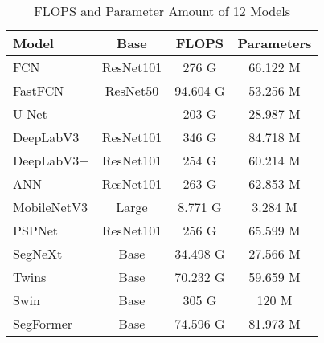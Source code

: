 \begin{table*}[!h]
\caption{FLOPS and Parameter Amount of 12 Models}
\label{tab:parameters}
\noindent
\begin{tabular}{lccc}
\toprule
Model       & Base & FLOPS & Parameters \\ \midrule
FCN         & ResNet101 & 276 G & 66.122 M \\
FastFCN     & ResNet50 & 94.604 G & 53.256 M \\
U-Net       & -        & 203 G & 28.987 M \\
DeepLabV3   & ResNet101 & 346 G & 84.718 M \\
DeepLabV3+  & ResNet101 & 254 G & 60.214 M \\
ANN         & ResNet101 & 263 G & 62.853 M \\
MobileNetV3 & Large & 8.771 G    & 3.284 M \\
PSPNet      & ResNet101 & 256 G & 65.599 M \\
SegNeXt     & Base & 34.498 G & 27.566 M \\
Twins       & Base & 70.232 G & 59.659 M \\
Swin        & Base & 305 G & 120 M \\
SegFormer   & Base & 74.596 G & 81.973 M \\
\bottomrule
\end{tabular}
\end{table*}
